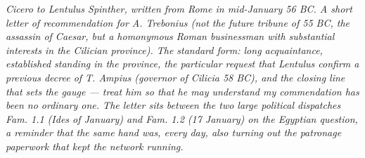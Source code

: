 
\textit{Cicero to Lentulus Spinther, written from Rome in
mid-January 56 BC. A short letter of recommendation for
A. Trebonius (not the future tribune of 55 BC, the assassin of
Caesar, but a homonymous Roman businessman with substantial
interests in the Cilician province). The standard form: long
acquaintance, established standing in the province, the
particular request that Lentulus confirm a previous decree of
T. Ampius (governor of Cilicia 58 BC), and the closing line that
sets the gauge --- treat him so that he may understand my
commendation has been no ordinary one. The letter sits between
the two large political dispatches Fam. 1.1 (Ides of January)
and Fam. 1.2 (17 January) on the Egyptian question, a reminder
that the same hand was, every day, also turning out the
patronage paperwork that kept the network running.}
